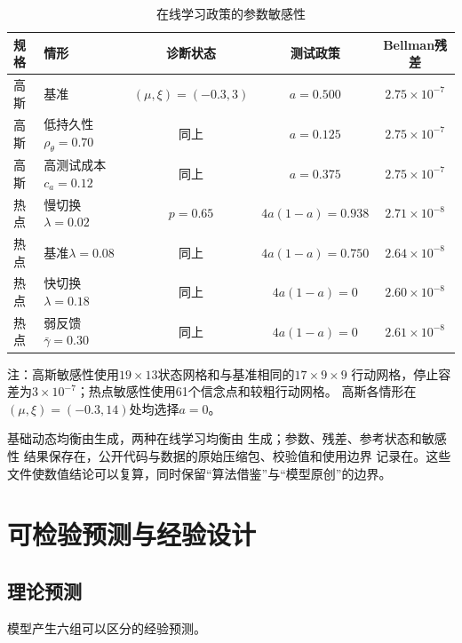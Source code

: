\documentclass[UTF8, a4paper, 12pt, fontset=fandol]{ctexart}
\theoremstyle{definition}
\theoremstyle{remark}
\begin{document}
\begin{table}[H]
  \centering
  \scriptsize
  \caption{在线学习政策的参数敏感性}
  \label{tab:在线学习敏感性}
  \begin{tabular}{llccc}
    \toprule
    规格 & 情形 & 诊断状态 & 测试政策 & Bellman残差 \\
    \midrule
    高斯 & 基准 & $(\mu,\xi)=(-0.3,3)$ & $a=0.500$ & $2.75\times10^{-7}$ \\
    高斯 & 低持久性$\rho_\theta=0.70$ & 同上 & $a=0.125$ & $2.75\times10^{-7}$ \\
    高斯 & 高测试成本$c_a=0.12$ & 同上 & $a=0.375$ & $2.75\times10^{-7}$ \\
    热点 & 慢切换$\lambda=0.02$ & $p=0.65$ & $4a(1-a)=0.938$ & $2.71\times10^{-8}$ \\
    热点 & 基准$\lambda=0.08$ & 同上 & $4a(1-a)=0.750$ & $2.64\times10^{-8}$ \\
    热点 & 快切换$\lambda=0.18$ & 同上 & $4a(1-a)=0$ & $2.60\times10^{-8}$ \\
    热点 & 弱反馈$\bar\gamma=0.30$ & 同上 & $4a(1-a)=0$ & $2.61\times10^{-8}$ \\
    \bottomrule
  \end{tabular}
  \begin{minipage}{0.96\textwidth}
    \footnotesize\raggedright
    注：高斯敏感性使用$19\times13$状态网格和与基准相同的$17\times9\times9$
    行动网格，停止容差为$3\times10^{-7}$；热点敏感性使用61个信念点和较粗行动网格。
    高斯各情形在$(\mu,\xi)=(-0.3,14)$处均选择$a=0$。
  \end{minipage}
\end{table}

基础动态均衡由生成，两种在线学习均衡由
生成；参数、残差、参考状态和敏感性
结果保存在，公开代码与数据的原始压缩包、校验值和使用边界
记录在。这些
文件使数值结论可以复算，同时保留“算法借鉴”与“模型原创”的边界。
\section{可检验预测与经验设计}
\label{sec:emp}

\subsection{理论预测}
模型产生六组可以区分的经验预测。
\end{document}
